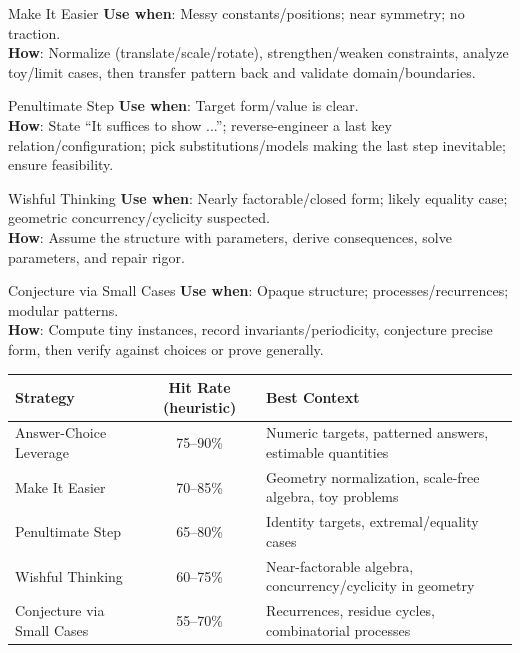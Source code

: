 \documentclass{article}
\begin{document}
\begin{strategybox}{Make It Easier}
\textbf{Use when}: Messy constants/positions; near symmetry; no traction.\\
\textbf{How}: Normalize (translate/scale/rotate), strengthen/weaken constraints, analyze toy/limit cases, then transfer pattern back and validate domain/boundaries.
\end{strategybox}

\begin{strategybox}{Penultimate Step}
\textbf{Use when}: Target form/value is clear.\\
\textbf{How}: State “It suffices to show ...”; reverse-engineer a last key relation/configuration; pick substitutions/models making the last step inevitable; ensure feasibility.
\end{strategybox}

\begin{strategybox}{Wishful Thinking}
\textbf{Use when}: Nearly factorable/closed form; likely equality case; geometric concurrency/cyclicity suspected.\\
\textbf{How}: Assume the structure with parameters, derive consequences, solve parameters, and repair rigor.
\end{strategybox}

\begin{strategybox}{Conjecture via Small Cases}
\textbf{Use when}: Opaque structure; processes/recurrences; modular patterns.\\
\textbf{How}: Compute tiny instances, record invariants/periodicity, conjecture precise form, then verify against choices or prove generally.
\end{strategybox}

\begin{center}
\begin{tabular}{|l|c|l|}
\hline
\textbf{Strategy} & \textbf{Hit Rate (heuristic)} & \textbf{Best Context} \\
\hline
Answer-Choice Leverage & 75--90\% & Numeric targets, patterned answers, estimable quantities \\
Make It Easier & 70--85\% & Geometry normalization, scale-free algebra, toy problems \\
Penultimate Step & 65--80\% & Identity targets, extremal/equality cases \\
Wishful Thinking & 60--75\% & Near-factorable algebra, concurrency/cyclicity in geometry \\
Conjecture via Small Cases & 55--70\% & Recurrences, residue cycles, combinatorial processes \\
\hline
\end{tabular}
\end{center}
\end{document}
